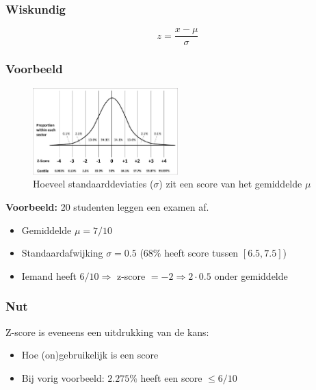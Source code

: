 \documentclass{article}
\begin{document}
\subsubsection{Wiskundig}

\begin{equation}
    z = \frac{x - \mu}{\sigma}
\end{equation}

\subsubsection{Voorbeeld}

\begin{figure}[H]
    \centering
    \includegraphics[width=0.5\textwidth]{z-score.png}
    \caption{Hoeveel standaarddeviaties ($\sigma$) zit een score van het gemiddelde $\mu$}
\end{figure}

\textbf{Voorbeeld:} 20 studenten leggen een examen af.

\begin{itemize}
    \item Gemiddelde $\mu = 7/10$
    \item Standaardafwijking $\sigma = 0.5$ ($68\%$ heeft score tussen $[6.5, 7.5]$)
    \item Iemand heeft $6/10 \Rightarrow$ z-score $= -2 \Rightarrow 2\cdot 0.5$ onder gemiddelde 
\end{itemize}

\subsubsection{Nut}

Z-score is eveneens een uitdrukking van de kans:

\begin{itemize}
    \item Hoe (on)gebruikelijk is een score
    \item Bij vorig voorbeeld: $2.275\%$ heeft een score $\leq 6/10$
\end{itemize}
\end{document}
